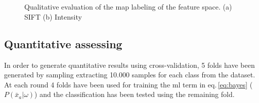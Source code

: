 \documentclass[a4paper, 10pt, conference]{llncs}      %
\begin{document}
\begin{figure}[Htbp]
\centering
{}\,
\\
\,
\caption{ Qualitative evaluation of the \ac{map} labeling of the feature space. (a) SIFT (b) Intensity}
\label{fig:mapQualitativeResults2}
\end{figure}

\subsection{Quantitative assessing}
In order to generate quantitative results using cross-validation, 5 folds have been generated by sampling extracting 10.000 samples for each class from the dataset. At each round 4 folds have been used for training the \ac{ml} term in eq.\,\ref{eq:bayes} ($P(\bar{x}_a|\omega)$) and the classification has been tested using the remaining fold.

\begin{figure}[Htbp]
\centering
{}
\caption{}
\label{fig:mapQuantitativeResults}
\end{figure}


\begin{figure}[Htbp]

 
\caption{}
\label{fig:quantitativeComparison}
\end{figure}
\end{document}

